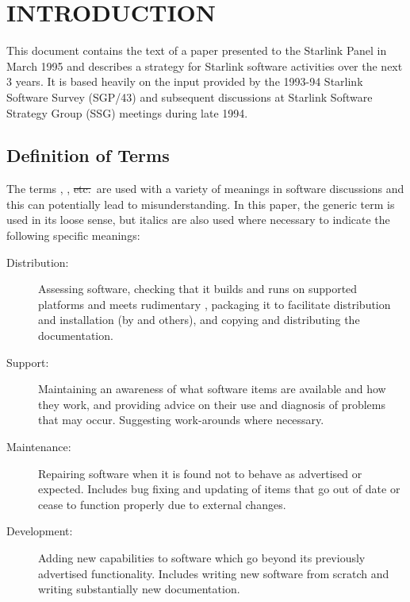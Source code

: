 

\section{INTRODUCTION}

This document contains the text of a paper presented to the Starlink
Panel in March 1995 and describes a strategy for Starlink software
activities over the next 3 years. It is based heavily on the input
provided by the 1993-94 Starlink Software Survey (SGP/43) and
subsequent discussions at Starlink Software Strategy Group
(SSG) meetings during late 1994.

\subsection{Definition of Terms}

The terms , , \st{etc.}\ are used with a
variety of meanings in software discussions and this can potentially
lead to misunderstanding. In this paper, the generic term 
is used in its loose sense, but italics are also used where necessary
to indicate the following specific meanings:

\begin{description}
\item[\label{distribution}Distribution:]
Assessing software, checking that it builds and runs on supported
platforms and meets rudimentary , packaging it to
facilitate distribution and installation (by  and
others), and copying and distributing the documentation.

\item[\label{support}Support:]
Maintaining an awareness of what software items are available and how
they work, and providing advice on their use and diagnosis of problems
that may occur. Suggesting work-arounds where necessary.

\item[\label{maintenance}Maintenance:]
Repairing software when it is found not to behave as advertised or
expected. Includes bug fixing and updating of items that go out of
date or cease to function properly due to external changes.

\item[\label{development}Development:]
Adding new capabilities to software which go beyond its previously
advertised functionality. Includes writing new software from scratch
and writing substantially new documentation.

\end{description}

